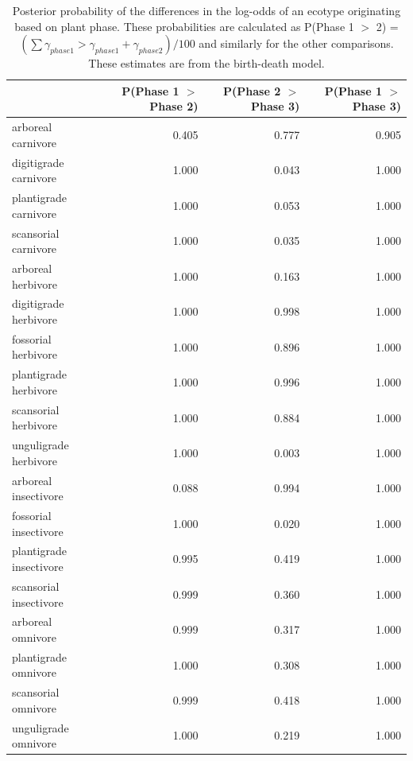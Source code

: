 \begin{table}[ht]
  \centering
  \caption[Posterior probablity estimates of differences in origination by plant phase]{Posterior probability of the differences in the log-odds of an ecotype originating based on plant phase. These probabilities are calculated as P(Phase 1 \(>\) 2) = \( (\sum \gamma_{phase 1} > \gamma_{phase 1} + \gamma_{phase 2}) / 100\) and similarly for the other comparisons. These estimates are from the birth-death model.}
  \label{tab:origin_plant}
  \begin{tabular}{ l r r r }
    \hline
    & P(Phase 1 $>$ Phase 2) & P(Phase 2 $>$ Phase 3) & P(Phase 1 $>$ Phase 3) \\ 
    \hline
    arboreal carnivore & 0.405 & 0.777 & 0.905 \\ 
    digitigrade carnivore & 1.000 & 0.043 & 1.000 \\ 
    plantigrade carnivore & 1.000 & 0.053 & 1.000 \\ 
    scansorial carnivore & 1.000 & 0.035 & 1.000 \\ 
    arboreal herbivore & 1.000 & 0.163 & 1.000 \\ 
    digitigrade herbivore & 1.000 & 0.998 & 1.000 \\ 
    fossorial herbivore & 1.000 & 0.896 & 1.000 \\ 
    plantigrade herbivore & 1.000 & 0.996 & 1.000 \\ 
    scansorial herbivore & 1.000 & 0.884 & 1.000 \\ 
    unguligrade herbivore & 1.000 & 0.003 & 1.000 \\ 
    arboreal insectivore & 0.088 & 0.994 & 1.000 \\ 
    fossorial insectivore & 1.000 & 0.020 & 1.000 \\ 
    plantigrade insectivore & 0.995 & 0.419 & 1.000 \\ 
    scansorial insectivore & 0.999 & 0.360 & 1.000 \\ 
    arboreal omnivore & 0.999 & 0.317 & 1.000 \\ 
    plantigrade omnivore & 1.000 & 0.308 & 1.000 \\ 
    scansorial omnivore & 0.999 & 0.418 & 1.000 \\ 
    unguligrade omnivore & 1.000 & 0.219 & 1.000 \\ 
    \hline
  \end{tabular}
\end{table}



